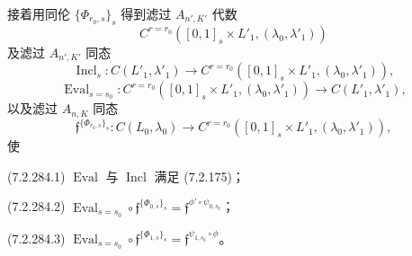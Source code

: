 接着用同伦
$\{\Phi_{r_0,s}\}_s$
得到滤过 $A_{n',K'}$ 代数
\[
C^{r=r_0}
([0,1]_s\times L'_1,(\lambda_0,\lambda'_1))
\]
及滤过 $A_{n',K'}$ 同态
\begin{equation}
\operatorname{Incl}_s\colon
C(L'_1,\lambda'_1)\longrightarrow
C^{r=r_0}
([0,1]_s\times L'_1,(\lambda_0,\lambda'_1)),
\tag{7.2.283.1}\label{eq:7-2-283-1}
\end{equation}
\begin{equation}
\operatorname{Eval}_{s=s_0}\colon
C^{r=r_0}
([0,1]_s\times L'_1,(\lambda_0,\lambda'_1))
\longrightarrow C(L'_1,\lambda'_1),
\tag{7.2.283.2}\label{eq:7-2-283-2}
\end{equation}
以及滤过 $A_{n,K}$ 同态
\begin{equation}
\mathfrak f^{\{\Phi_{r_0,s}\}_s}\colon
C(L_0,\lambda_0)\longrightarrow
C^{r=r_0}
([0,1]_s\times L'_1,(\lambda_0,\lambda'_1)),
\tag{7.2.283.3}\label{eq:7-2-283-3}
\end{equation}
使

\par\noindent\textup{(7.2.284.1)}
$\operatorname{Eval}$ 与
$\operatorname{Incl}$ 满足 (7.2.175)；

\par\noindent\textup{(7.2.284.2)}
$\operatorname{Eval}_{s=s_0}\circ
\mathfrak f^{\{\Phi_{0,s}\}_s}
=\mathfrak f^{\phi'\circ\psi_{0,s_0}}$；

\par\noindent\textup{(7.2.284.3)}
$\operatorname{Eval}_{s=s_0}\circ
\mathfrak f^{\{\Phi_{1,s}\}_s}
=\mathfrak f^{\psi_{1,s_0}\circ\phi}$。
